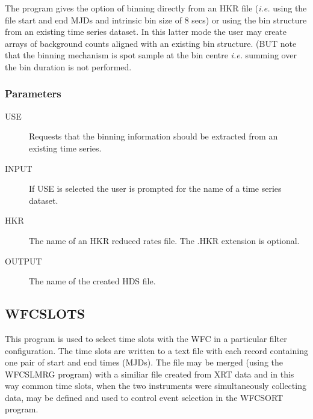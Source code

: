 The program gives the option of binning directly from an HKR file ({\it i.e.}
using the file start and end MJDs and intrinsic bin size of 8 secs)  or using
the bin structure from an existing time series dataset. In this latter mode the
user may create arrays of background counts aligned with an existing bin
structure. (BUT note that the binning mechanism is spot sample at the bin
centre {\it i.e.} summing over the bin duration is not performed.

\subsubsection{Parameters}
\begin{description}
\item[USE]
Requests that the binning information should be extracted from an
existing time series.
\item[INPUT]
If USE is selected the user is prompted for the name of a time series
dataset.
\item[HKR]
The name of an HKR reduced rates file. The .HKR extension is
optional.
\item[OUTPUT]
The name of the created HDS file.
\end{description}

\subsection{WFCSLOTS}

This program is used to select time slots with the WFC in a particular filter
configuration. The time slots are written to a text file with each record
containing one pair of start and end times (MJDs). The file may be merged
(using the WFCSLMRG program) with a similiar file created from XRT data and in
this way common time slots, when the two instruments were simultaneously
collecting data, may be defined and used to control event selection in the
WFCSORT program.


